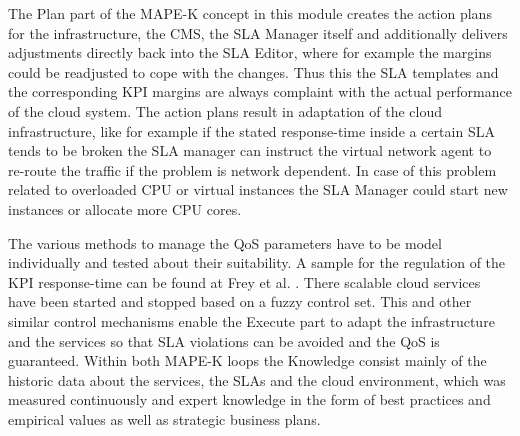 The Plan part of the MAPE-K concept in this module creates the action plans for the infrastructure, the CMS, the SLA Manager itself and additionally delivers adjustments directly back into the SLA Editor, where for example the margins could be readjusted to cope with the changes. Thus this the SLA templates and the corresponding KPI margins are always complaint with the actual performance of the cloud system. The action plans result in adaptation of the cloud infrastructure, like for example if the stated response-time inside a certain SLA tends to be broken the SLA manager can instruct the virtual network agent to re-route the traffic if the problem is network dependent. In case of this problem related to overloaded CPU or virtual instances the SLA Manager could start new instances or allocate more CPU cores.

The various methods to manage the QoS parameters have to be model individually and tested about their suitability. A sample for the regulation of the KPI response-time can be found at Frey et al. \cite{Fuzzy}. There scalable cloud services have been started and stopped based on a fuzzy control set. This and other similar control mechanisms enable the Execute part to adapt the infrastructure and the services so that SLA violations can be avoided and the QoS is guaranteed. Within both MAPE-K loops the Knowledge consist mainly of the historic data about the services, the SLAs and the cloud environment, which was measured continuously and expert knowledge in the form of best practices and empirical values as well as strategic business plans. %


